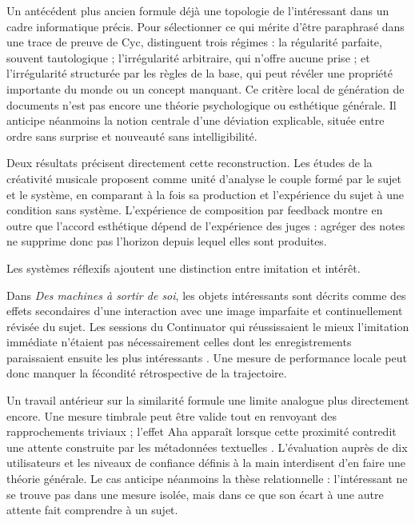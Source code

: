\documentclass[11pt,a4paper]{article}
\begin{document}
Un antécédent plus ancien formule déjà une topologie de l'intéressant dans un
cadre informatique précis. Pour sélectionner ce qui mérite d'être paraphrasé
dans une trace de preuve de Cyc, \textcite{milipachet1995regularity} distinguent
trois régimes : la régularité parfaite, souvent tautologique ; l'irrégularité
arbitraire, qui n'offre aucune prise ; et l'irrégularité structurée par les
règles de la base, qui peut révéler une propriété importante du monde ou un
concept manquant. Ce critère local de génération de documents n'est pas encore
une théorie psychologique ou esthétique générale. Il anticipe néanmoins la
notion centrale d'une déviation explicable, située entre ordre sans surprise et
nouveauté sans intelligibilité.

Deux résultats précisent directement cette reconstruction. Les études de la
créativité musicale proposent comme unité d'analyse le couple formé par le sujet
et le système, en comparant à la fois sa production et l'expérience du sujet à
une condition sans système. L'expérience de composition par feedback montre en
outre que l'accord esthétique dépend de l'expérience des juges : agréger des
notes ne supprime donc pas l'horizon depuis lequel elles sont produites.

Les systèmes réflexifs ajoutent une distinction entre imitation et intérêt.

Dans \emph{Des machines à sortir de soi}, les objets intéressants sont décrits comme
des effets secondaires d'une interaction avec une image imparfaite et
continuellement révisée du sujet. Les sessions du Continuator qui réussissaient
le mieux l'imitation immédiate n'étaient pas nécessairement celles dont les
enregistrements paraissaient ensuite les plus intéressants
\parencite{pachet2008machines}. Une mesure de performance locale peut donc
manquer la fécondité rétrospective de la trajectoire.

Un travail antérieur sur la similarité formule une limite analogue plus
directement encore. Une mesure timbrale peut être valide tout en renvoyant des
rapprochements triviaux ; l'effet Aha apparaît lorsque cette proximité contredit
une attente construite par les métadonnées textuelles
\parencite{aucouturier2002similarity}. L'évaluation auprès de dix utilisateurs et
les niveaux de confiance définis à la main interdisent d'en faire une théorie
générale. Le cas anticipe néanmoins la thèse relationnelle : l'intéressant ne se
trouve pas dans une mesure isolée, mais dans ce que son écart à une autre attente
fait comprendre à un sujet.
\end{document}
